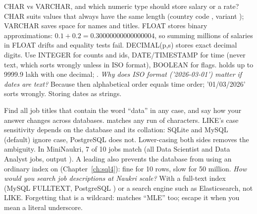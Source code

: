 \begin{qa}{CHAR vs VARCHAR, and which numeric type should store salary or a rate?}
\why CHAR suits values that always have the same length (country code , variant ); VARCHAR saves space for names and titles. FLOAT
stores binary approximations: $0.1 + 0.2 = 0.30000000000000004$, so summing millions of salaries in FLOAT drifts and equality tests fail. DECIMAL(p,s)
stores exact decimal digits. Use INTEGER for counts and ids, DATE/TIMESTAMP for time (never text, which sorts wrongly unless in ISO format), BOOLEAN for
flags.
\worked {} holds up to 9999.9 lakh with one decimal; .
\pushes \emph{Why does ISO format ('2026-03-01') matter if dates are text?} Because then alphabetical order equals time order; '01/03/2026' sorts wrongly.
\pitfall Storing dates as  strings.
\end{qa}

\begin{qa}{Find all job titles that contain the word ``data'' in any case, and say how your answer changes across databases.}
\why \code{\%} matches any run of characters. LIKE's case sensitivity depends on the database and its collation: SQLite and MySQL (default) ignore case,
PostgreSQL does not. Lower-casing both sides removes the ambiguity.
\worked In MiniNaukri, 7 of 10 jobs match (all Data Scientist and Data Analyst jobs, output ). A leading \code{\%} also prevents
the database from using an ordinary index on  (Chapter~\ref{ch:sql4}): fine for 10 rows, slow for 50 million.
\pushes \emph{How would you search job descriptions at Naukri scale?} With a full-text index (MySQL FULLTEXT, PostgreSQL ) or a search
engine such as Elasticsearch, not LIKE.
\pitfall Forgetting that \code{\_} is a wildcard:  matches ``MLE'' too; escape it when you mean a literal underscore.
\end{qa}

